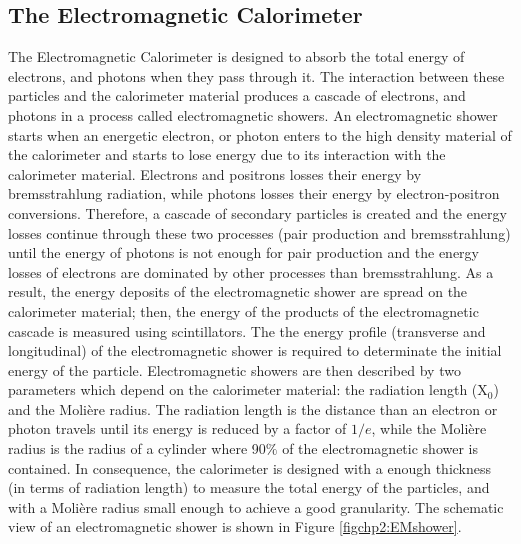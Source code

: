 
\subsection{The Electromagnetic Calorimeter}
\label{subsec:ECal}

\noindent The Electromagnetic Calorimeter is designed to absorb the total energy 
of electrons, and photons when they pass through it. The interaction between these 
particles and the calorimeter material produces a cascade of electrons, and photons in a process 
called electromagnetic showers. An electromagnetic shower starts when an energetic electron, 
or photon enters to the high density material of the calorimeter and starts to lose energy
due to its interaction with the calorimeter material. Electrons and 
positrons losses their energy by bremsstrahlung radiation, while photons 
losses their energy by electron-positron conversions. Therefore, a cascade
of secondary particles is created and the energy losses continue through 
these two processes (pair production and bremsstrahlung) until the energy of photons is not
enough for pair production and the energy losses of electrons are dominated by other processes 
than bremsstrahlung. As a result, the energy deposits of the electromagnetic shower 
are spread on the calorimeter material; then, the energy of 
the products of the electromagnetic cascade is measured using scintillators. The
the energy profile (transverse and longitudinal) of the electromagnetic shower is 
required to determinate the initial energy of the particle. Electromagnetic showers 
are then described by two parameters which depend
on the calorimeter material: the radiation length (X$_{0}$) and the Moli\`ere radius. The radiation length is 
the distance than an electron or photon travels until its energy is reduced by a factor 
of $1/e$, while the Moli\`ere radius is the radius of a cylinder where 90$\%$ of 
the electromagnetic shower is contained. In consequence, the calorimeter 
is designed with a enough thickness (in terms of radiation length) to measure the total
energy of the particles, and with a Moli\`ere radius small enough to achieve a good granularity. 
The schematic view of an electromagnetic shower is shown in Figure \ref{figchp2:EMshower}. 

